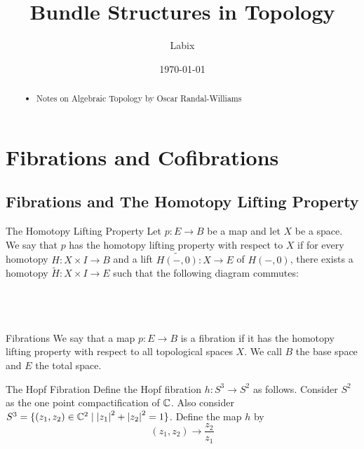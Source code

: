 \documentclass[a4paper]{article}
\title{Bundle Structures in Topology}
\author{Labix}
\date{\today}
\begin{document}
\maketitle
\begin{abstract}
\begin{itemize}
\item Notes on Algebraic Topology by Oscar Randal-Williams
\end{itemize}
\end{abstract}
\pagebreak
\tableofcontents

\pagebreak
\section{Fibrations and Cofibrations}
\subsection{Fibrations and The Homotopy Lifting Property}
\begin{defn}{The Homotopy Lifting Property}{} Let $p:E\to B$ be a map and let $X$ be a space. We say that $p$ has the homotopy lifting property with respect to $X$ if for every homotopy $H:X\times I\to B$ and a lift $\widetilde{H(-,0)}:X\to E$ of $H(-,0)$, there exists a homotopy $\widetilde{H}:X\times I\to E$ such that the following diagram commutes: \\~\\
\\~\\
\end{defn}

\begin{defn}{Fibrations}{} We say that a map $p:E\to B$ is a fibration if it has the homotopy lifting property with respect to all topological spaces $X$. We call $B$ the base space and $E$ the total space. 
\end{defn}

\begin{defn}{The Hopf Fibration}{} Define the Hopf fibration $h:S^3\to S^2$ as follows. Consider $S^2$ as the one point compactification of $\mathbb{C}$. Also consider $S^3=\{(z_1,z_2)\in\mathbb{C}^2\;|\;\abs{z_1}^2+\abs{z_2}^2=1\}$. Define the map $h$ by $$(z_1,z_2)\to\frac{z_2}{z_1}$$
\end{defn}
\end{document}
